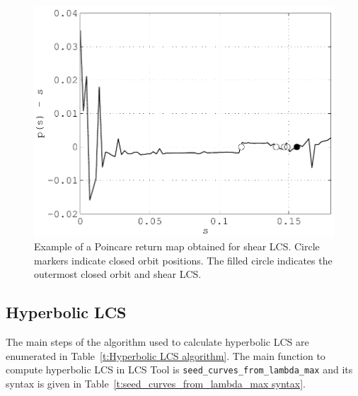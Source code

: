 \documentclass{article}
\begin{document}
\begin{figure}
\begin{center}
\includegraphics[width=\textwidth]{graphics/double_gyre/poincare_return_map}
\end{center}
\caption{Example of a Poincare return map obtained for shear LCS. Circle markers indicate closed orbit positions. The filled circle indicates the outermost closed orbit and shear LCS.}
\label{f:Poincare return map}
\end{figure}

\subsection{Hyperbolic LCS}

The main steps of the algorithm used to calculate hyperbolic LCS are enumerated in Table~\ref{t:Hyperbolic LCS algorithm}. The main function to compute hyperbolic LCS in LCS Tool is \lstinline!seed_curves_from_lambda_max! and its syntax is given in Table~\ref{t:seed_curves_from_lambda_max syntax}.
\end{document}
